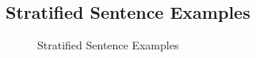 \documentclass{article}
\begin{document}
\hypertarget{stratified-sentence-examples}{%
\subsection{Stratified Sentence
Examples}\label{stratified-sentence-examples}}

\hphantom{em}
\begin{figure}[H]
\caption{ Stratified Sentence Examples  \label{fig:ft_sample_precision_precision1}}
\end{figure}
\clearpage
\end{document}
